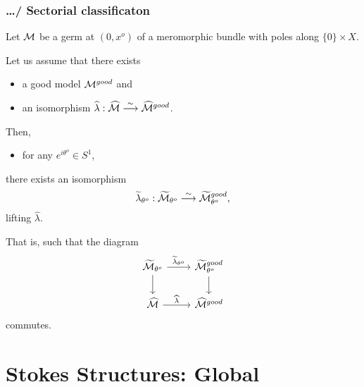 \subsection{\dots / Sectorial classificaton} %
\begin{paracol}{2} %
  \switchcolumn{} %
  Let $\mathcal{M}$ be a germ at $(0,x^o)$ of a meromorphic bundle with poles along
  $\{0\}\times X$.
  \begin{thm}[II.5.12]
    Let us assume that there exists
    \begin{itemize}
      \item a good model $\mathcal{M}^{good}$ and
      \item an isomorphism $\widehat\lambda: \widehat{\mathcal{M}}
        \overset{\sim}{\longrightarrow}\widehat{\mathcal{M}}^{good}$.
    \end{itemize}
    Then,
    \begin{itemize}
      \item for any $e^{i\theta^o}\in S^1$,
    \end{itemize}
    there exists an isomorphism
    \[
      \widetilde\lambda_{\theta^o}: \widetilde{\mathcal{M}}_{\theta^o}
      \overset{\sim}{\longrightarrow}\widetilde{\mathcal{M}}^{good}_{\theta^o},
    \]
    lifting $\hat\lambda$.
  \end{thm}
  That is, such that the diagram
  \[ \begin{tikzcd}
      \tilde\cM_{\theta^o} \dar \rar{\tilde\lambda_{\theta^o}} &
        \tilde\cM^{good}_{\theta^o} \dar
        \\\hat\cM \rar{\hat\lambda} &
        \hat\cM^{good}
  \end{tikzcd} \]
  commutes.
\end{paracol} %

\chapter{Stokes Structures: Global}
